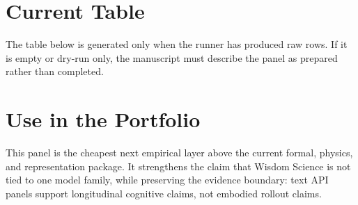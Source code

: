 \documentclass[11pt]{article}
\begin{document}
\section{Current Table}

The table below is generated only when the runner has produced raw rows.
If it is empty or dry-run only, the manuscript must describe the panel as prepared rather than completed.

\begin{table}[t]
\centering
\small
\caption{API WisdomBench longitudinal panel summary.}
\end{table}

\section{Use in the Portfolio}

This panel is the cheapest next empirical layer above the current formal, physics, and representation package.
It strengthens the claim that Wisdom Science is not tied to one model family, while preserving the evidence boundary: text API panels support longitudinal cognitive claims, not embodied rollout claims.
\end{document}
